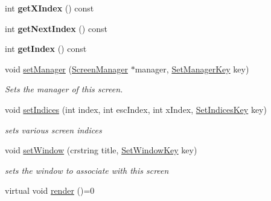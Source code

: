 \begin{DoxyCompactItemize}
\mbox{\label{classnta_1_1Screen_a01f4fdd4cadd6abe4fef2605a0fde52a}} 
int {\bfseries get\+X\+Index} () const
\item 
\mbox{\label{classnta_1_1Screen_aba9c09cd06dfc05557b86d866a7fb2b9}} 
int {\bfseries get\+Next\+Index} () const
\item 
\mbox{\label{classnta_1_1Screen_ae149bdd787f8f41b45c667faef971326}} 
int {\bfseries get\+Index} () const
\item 
\mbox{\label{classnta_1_1Screen_a9c9329a6700fbed8ab6513d471835bfa}} 
void \hyperlink{classnta_1_1Screen_a9c9329a6700fbed8ab6513d471835bfa}{set\+Manager} (\hyperlink{classnta_1_1ScreenManager}{Screen\+Manager} $\ast$manager, \hyperlink{classnta_1_1SetManagerKey}{Set\+Manager\+Key} key)
\begin{DoxyCompactList}\small\item\em Sets the manager of this screen. \end{DoxyCompactList}\item 
\mbox{\label{classnta_1_1Screen_afd02c1e6f40bb7262cc23e2d0583544b}} 
void \hyperlink{classnta_1_1Screen_afd02c1e6f40bb7262cc23e2d0583544b}{set\+Indices} (int index, int esc\+Index, int x\+Index, \hyperlink{classnta_1_1SetIndicesKey}{Set\+Indices\+Key} key)
\begin{DoxyCompactList}\small\item\em sets various screen indices \end{DoxyCompactList}\item 
\mbox{\label{classnta_1_1Screen_a427eb6b2e064c23a19e7b9076b8eb2c9}} 
void \hyperlink{classnta_1_1Screen_a427eb6b2e064c23a19e7b9076b8eb2c9}{set\+Window} (crstring title, \hyperlink{classnta_1_1SetWindowKey}{Set\+Window\+Key} key)
\begin{DoxyCompactList}\small\item\em sets the window to associate with this screen \end{DoxyCompactList}\item 
\mbox{\label{classnta_1_1Screen_a323ff61ac31f55bd39fa818ccd8200fb}} 
virtual void \hyperlink{classnta_1_1Screen_a323ff61ac31f55bd39fa818ccd8200fb}{render} ()=0

\end{DoxyCompactItemize}
